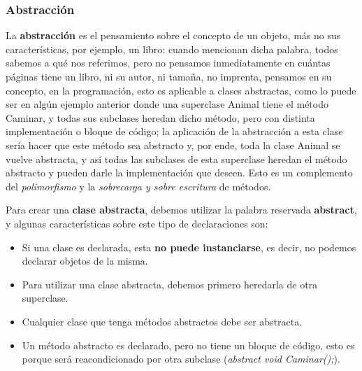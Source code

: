 \subsubsection{Abstracción}
\hspace{0.55cm}La \textbf{abstracción} es el pensamiento sobre el concepto de un objeto, más no sus características, por ejemplo, un libro: cuando mencionan dicha palabra, todos sabemos a qué nos referimos, pero no pensamos inmediatamente en cuántas páginas tiene un libro, ni su autor, ni tamaña, no imprenta, pensamos en su concepto, en la programación, esto es aplicable a clases abstractas, como lo puede ser en algún ejemplo anterior donde una superclase Animal tiene el método Caminar, y todas sus subclases heredan dicho método, pero con distinta implementación o bloque de código; la aplicación de la abstracción a esta clase sería hacer que este método sea abstracto y, por ende, toda la clase Animal se vuelve abstracta, y así todas las subclases de esta superclase heredan el método abstracto y pueden darle la implementación que deseen. Esto es un complemento del \textit{polimorfismo} y la \textit{sobrecarga y sobre escritura} de métodos.

Para crear una \textbf{clase abstracta}, debemos utilizar la palabra reservada \textbf{abstract}, y algunas características sobre este tipo de declaraciones son:
\begin{itemize}
    \item Si una clase es declarada, esta \textbf{no puede instanciarse}, es decir, no podemos declarar objetos de la misma.
    \item Para utilizar una clase abstracta, debemos primero heredarla de otra superclase.
    \item Cualquier clase que tenga métodos abstractos debe ser abstracta.
    \item Un método abstracto es declarado, pero no tiene un bloque de código, esto es porque será reacondicionado por otra subclase (\textit{abstract void Caminar();}).
\end{itemize}

